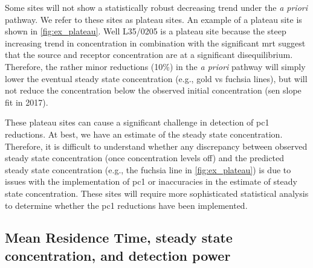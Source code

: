 Some sites will not show a statistically robust decreasing trend under the \textit{a priori} pathway. We refer to these sites as plateau sites.  An example of a plateau site is shown in \autoref{fig:ex_plateau}. Well L35/0205 is a plateau site because the steep increasing trend in concentration in combination with the significant \gls{mrt} suggest that the source and receptor concentration are at a significant disequilibrium. Therefore, the rather minor reductions (10\%) in the \textit{a priori} pathway will simply lower the eventual steady state concentration (e.g., gold vs fuchsia lines), but will not reduce the concentration below the observed initial concentration (sen slope fit in 2017).


These plateau sites can cause a significant challenge in detection of \gls{pc1} reductions. At best, we have an estimate of the steady state concentration. Therefore, it is difficult to understand whether any discrepancy between observed steady state concentration (once concentration levels off) and the predicted steady state concentration (e.g., the fuchsia line in \autoref{fig:ex_plateau}) is due to issues with the implementation of \gls{pc1} or inaccuracies in the estimate of steady state concentration. These sites will require more sophisticated statistical analysis to determine whether the \gls{pc1} reductions have been implemented.





\begin{landscape}
\end{landscape}

\subsection[Mean Residence Time Impacts]{Mean Residence Time, steady state concentration, and detection power} \label{sec:mrt_results}


